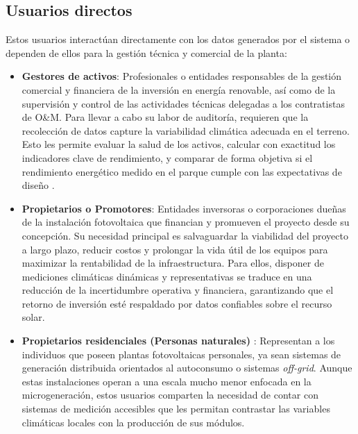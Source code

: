 \subsection{Usuarios directos}
Estos usuarios interactúan directamente con los datos generados por el sistema o dependen de ellos para la gestión técnica y comercial de la planta:

\begin{itemize}

    
    \item \textbf{Gestores de activos}: Profesionales o entidades responsables de la gestión comercial y financiera de la inversión en energía renovable, así como de la supervisión y control de las actividades técnicas delegadas a los contratistas de O\&M. Para llevar a cabo su labor de auditoría, requieren que la recolección de datos capture la variabilidad climática adecuada en el terreno. Esto les permite evaluar la salud de los activos, calcular con exactitud los indicadores clave de rendimiento, y comparar de forma objetiva si el rendimiento energético medido en el parque cumple con las expectativas de diseño \citep{ProyectoEjecutivo2024}.
    
    \item \textbf{Propietarios o Promotores}: Entidades inversoras o corporaciones dueñas de la instalación fotovoltaica que financian y promueven el proyecto desde su concepción. Su necesidad principal es salvaguardar la viabilidad del proyecto a largo plazo, reducir costos y prolongar la vida útil de los equipos para maximizar la rentabilidad de la infraestructura. Para ellos, disponer de mediciones climáticas dinámicas y representativas se traduce en una reducción de la incertidumbre operativa y financiera, garantizando que el retorno de inversión esté respaldado por datos confiables sobre el recurso solar\citep{ProyectoEjecutivo2024}.
    
    \item \textbf{Propietarios residenciales (Personas naturales)} : Representan a los individuos que poseen plantas fotovoltaicas personales, ya sean sistemas de generación distribuida orientados al autoconsumo o sistemas \textit{off-grid}. Aunque estas instalaciones operan a una escala mucho menor enfocada en la microgeneración, estos usuarios comparten la necesidad de contar con sistemas de medición accesibles que les permitan contrastar las variables climáticas locales con la producción de sus módulos. 
\end{itemize}

